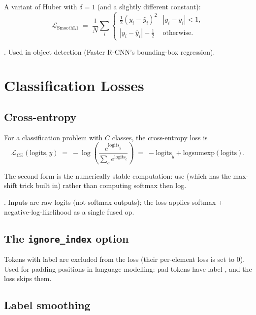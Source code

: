 A variant of Huber with $\delta = 1$ (and a slightly different
constant):
\[
\mathcal{L}_{\text{SmoothL1}} \;=\; \frac{1}{N} \sum_i
\begin{cases}
\tfrac{1}{2}(y_i - \hat y_i)^2 & |y_i - \hat y_i| < 1, \\
|y_i - \hat y_i| - \tfrac{1}{2} & \text{otherwise}.
\end{cases}
\]

. Used in object detection (Faster R-CNN's
bounding-box regression).

\section{Classification Losses}
\label{sec:losses:classification}

\subsection{Cross-entropy}
\label{ssec:losses:cross_entropy}

For a classification problem with $C$ classes, the
cross-entropy loss is
\[
\mathcal{L}_{\text{CE}}(\mathrm{logits}, y) \;=\; -\log\!\left(\frac{e^{\mathrm{logits}_y}}{\sum_c e^{\mathrm{logits}_c}}\right)
\;=\; -\mathrm{logits}_y + \mathrm{logsumexp}(\mathrm{logits}).
\]

The second form is the numerically stable computation: use
 (which has the max-shift trick built in) rather
than computing softmax then log.

.
Inputs are raw logits (not softmax outputs); the loss applies
softmax + negative-log-likelihood as a single fused op.

\subsection{The \texttt{ignore\_index} option}
\label{ssec:losses:ignore_index}

Tokens with label  are excluded from the
loss (their per-element loss is set to 0). Used for padding
positions in language modelling: pad tokens have label
, and the loss skips them.

\subsection{Label smoothing}
\label{ssec:losses:label_smoothing}

